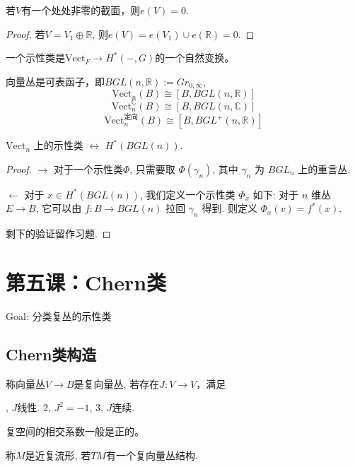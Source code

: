 \begin{corollary}
    若$V$有一个处处非零的截面，则$e(V)=0$.
\end{corollary}
\begin{proof}
    若$V=V_1\oplus \mathbb{R}$, 则$e(V) =e(V_1) \cup e(\mathbb{R}) =0$.
\end{proof}
    
\begin{definition}
    一个示性类是$\text{Vect}_F \rightarrow H^*(-, G)$的一个自然变换。
\end{definition}

\qquad 向量丛是可表函子，即$BGL(n, \mathbb{R}) := Gr_{0, \infty}$,
    $$\text{Vect}_n(B) \cong [B, BGL(n, \mathbb{R})]$$
    $$\text{Vect}^\mathbb{C}_n(B) \cong [B, BGL(n, \mathbb{C})]$$
    $$\text{Vect}^\text{定向}_n(B) \cong [B, BGL^+(n, \mathbb{R})]$$

\begin{theorem}[Yoneda引理]
    $\text{Vect}_n$ 上的示性类 $\leftrightarrow$ $H^*(BGL(n))$.
\end{theorem}
\begin{proof}
    $\rightarrow$ 对于一个示性类$\Phi$, 只需要取 $\Phi(\gamma_n)$, 
    其中 $\gamma_n$ 为 $BGL_n$ 上的重言丛.\par
    $\leftarrow$ 对于 $x\in H^*(BGL(n))$, 我们定义一个示性类 $\Phi_x$ 如下: 
    对于 $n$ 维丛 $E\to B$, 它可以由 $f:B\to BGL(n)$ 拉回 $\gamma_n$ 得到.
    则定义 $\Phi_x(v)=f^*(x)$.\par 
    剩下的验证留作习题.
\end{proof}



\section{第五课：Chern类}
\quad Goal: 分类复丛的示性类

\subsection{Chern类构造}

\begin{definition}
    称向量丛$V\rightarrow B$是复向量丛, 若存在$J: V \rightarrow V$，满足
    
    , $J$线性. 2, $J^2=-1$, 3, $J$连续.
\end{definition}

    \quad 复空间的相交系数一般是正的。

\begin{definition}
    称$M$是近复流形, 若$TM$有一个复向量丛结构.
\end{definition}


